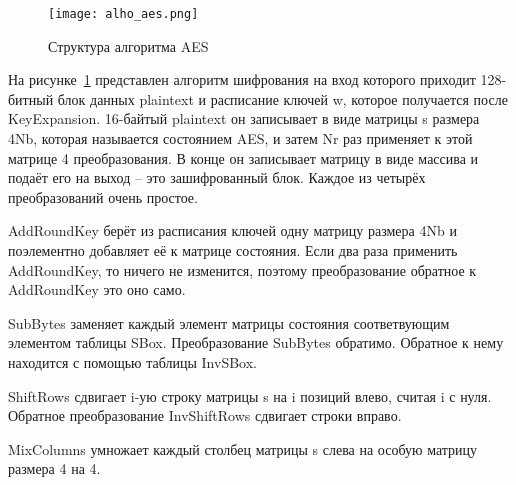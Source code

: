 \begin{figure}[ht]
\centering
  \texttt{[image: alho\_aes.png]}  
  \caption{Структура алгоритма AES}
  \label{fig:domain:manual_structure:structural_aes}
\end{figure}

На рисунке~\ref{fig:domain:manual_structure:structural_aes} представлен алгоритм шифрования на вход которого приходит 128-битный блок данных plaintext и расписание ключей w, которое получается после KeyExpansion. 16-байтый plaintext он записывает в виде матрицы s размера 4Nb, которая называется состоянием AES, и затем Nr раз применяет к этой матрице 4 преобразования. В конце он записывает матрицу в виде массива и подаёт его на выход -- это зашифрованный блок. Каждое из четырёх преобразований очень простое.

AddRoundKey берёт из расписания ключей одну матрицу размера 4Nb и поэлементно добавляет её к матрице состояния. Если два раза применить AddRoundKey, то ничего не изменится, поэтому преобразование обратное к AddRoundKey это оно само.

SubBytes заменяет каждый элемент матрицы состояния соответвующим элементом таблицы SBox. Преобразование SubBytes обратимо. Обратное к нему находится с помощью таблицы InvSBox.

ShiftRows сдвигает i-ую строку матрицы s на i позиций влево, считая i с нуля. Обратное преобразование InvShiftRows сдвигает строки вправо.

MixColumns умножает каждый столбец матрицы s слева на особую матрицу размера 4 на 4.

